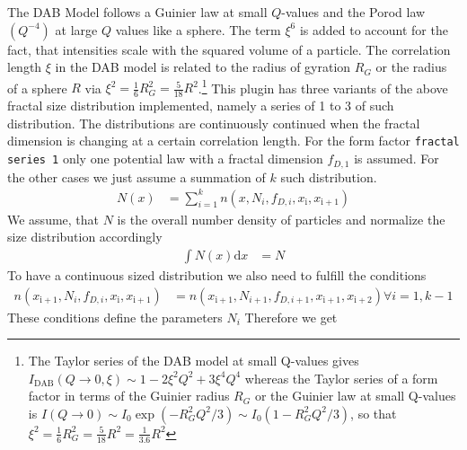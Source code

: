 The DAB Model follows a Guinier law at small $Q$-values and the Porod law $(Q^{-4})$ at large $Q$ values like a sphere. The term $\xi^6$ is added to account for the fact, that intensities scale with the squared volume of a particle. The correlation length $\xi$ in the DAB model is related to the radius of gyration $R_G$ or the radius of a sphere $R$  via $\xi^2=\frac{1}{6} R_G^2=\frac{5}{18} R^2$.\footnote{
The Taylor series of the DAB model at small Q-values gives $I_\text{DAB}(Q\rightarrow 0,\xi) \sim 1-2\xi^2Q^2+3\xi^4Q^4$ whereas the Taylor series of a form factor in terms of the Guinier radius $R_G$ or the Guinier law at small Q-values is $I(Q\rightarrow 0)\sim I_0\exp\left(-R_G^2Q^2/3\right)\sim I_0 \left(1-R_G^2Q^2/3\right)$, so that $\xi^2=\frac{1}{6} R_G^2=\frac{5}{18} R^2=\frac{1}{3.6} R^2$
}
This plugin has three variants of the above fractal size distribution implemented, namely a series of 1 to 3 of such distribution. The distributions are continuously continued when the fractal dimension is changing at a certain correlation length.
For the form factor \texttt{fractal series 1} only one potential law with a fractal dimension $f_{D,1}$ is assumed. For the other cases we just assume a summation of $k$ such distribution.
\begin{align}
N(x) &= \sum_{i=1}^k n(x,N_i,f_{D,i},x_\mathrm{i},x_\mathrm{i+1})
\end{align}
We assume, that $N$ is the overall number density of particles and normalize the size distribution accordingly
\begin{align}
\int N(x) \mathrm{d}x &= N
\end{align}
To have a continuous sized distribution we also need to fulfill the conditions
\begin{align}
n(x_\mathrm{i+1},N_i,f_{D,i},x_\mathrm{i},x_\mathrm{i+1}) &= n(x_\mathrm{i+1},N_{i+1},f_{D,i+1},x_\mathrm{i+1},x_\mathrm{i+2}) \forall i =1,k-1
\end{align}
These conditions define the parameters $N_i$ Therefore we get
